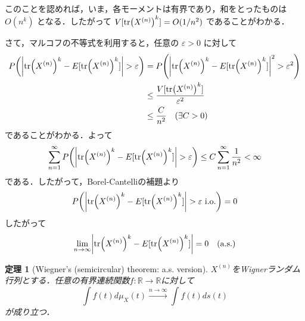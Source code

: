 \documentclass{ltjsarticle}
\makeatletter
\theoremstyle{mystyle1}
\newtheorem{thm}[dfn]{定理}
\theoremstyle{mystyle2}
\theoremstyle{mystyle3}
\renewenvironment{proof}[1][\proofname]{\par
  \pushQED{\qed}%
  \normalfont
  \topsep6\p@\@plus6\p@ \trivlist
  \item[\hskip\labelsep{\bfseries\sffamily #1}]\ignorespaces
}{%
  \popQED\endtrivlist\@endpefalse
}
\renewcommand\proofname{証明}
\makeatother
\begin{document}
\begin{proof}
    このことを認めれば，いま，各モーメントは有界であり，和をとったものは $O(n^k)$ となる．したがって $V[\tr(X^{(n)})^k]=O(1/n^2)$ であることがわかる．

    さて，マルコフの不等式を利用すると，任意の $\varepsilon>0$ に対して
    \begin{equation}
        \begin{split}
            P\mleft(\mleft|\tr(X^{(n)})^k-E[\tr(X^{(n)})^k]\mright|>\varepsilon\mright)
            & =P\mleft(\mleft|\tr(X^{(n)})^k-E[\tr(X^{(n)})^k]\mright|^2>\varepsilon^2\mright) \\
            & \leq\frac{V[\tr(X^{(n)})^k]}{\varepsilon^2}                                      \\
            & \leq\frac{C}{n^2}\quad(\exists C>0)
        \end{split}
    \end{equation}
    であることがわかる．よって
    \begin{equation}
        \sum_{n=1}^\infty P\mleft(\mleft|\tr(X^{(n)})^k-E[\tr(X^{(n)})^k]\mright|>\varepsilon\mright)\leq C\sum_{n=1}^\infty\frac{1}{n^2}<\infty
    \end{equation}
    である．したがって，Borel-Cantelliの補題より
    \begin{equation}
        P\mleft(\mleft|\tr(X^{(n)})^k-E[\tr(X^{(n)})^k]\mright|>\varepsilon\,\,\mathrm{i.o.}\mright)=0
    \end{equation}
    したがって
    \begin{equation}
        \lim_{n\to\infty}\mleft|\tr(X^{(n)})^k-E[\tr(X^{(n)})^k]\mright|=0\quad(\mathrm{a.s.})
    \end{equation}
\end{proof}

\begin{thm}[Wiegner's (semicircular) theorem: a.s. version]\label{thm:1.28}
    $X^{(n)}$をWignerランダム行列とする．任意の有界連続関数$f:\mathbb{R}\to\mathbb{R}$に対して
    \begin{equation}
        \int f(t)d\mu_{X}(t)\overset{n\to\infty}{\longrightarrow}\int f(t)ds(t)
    \end{equation}
    が成り立つ．
\end{thm}
\end{document}
